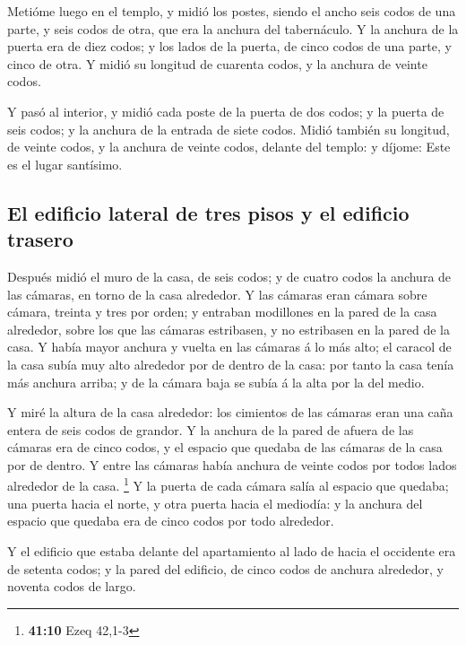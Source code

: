  Metióme luego en el templo, y midió los postes, siendo el
ancho seis codos de una parte, y seis codos de otra, que era la anchura
del tabernáculo.  Y la anchura de la puerta era de diez
codos; y los lados de la puerta, de cinco codos de una parte, y cinco de
otra. Y midió su longitud de cuarenta codos, y la anchura de veinte
codos.

 Y pasó al interior, y midió cada poste de la puerta de
dos codos; y la puerta de seis codos; y la anchura de la entrada de
siete codos.  Midió también su longitud, de veinte codos,
y la anchura de veinte codos, delante del templo: y díjome: Este es el
lugar santísimo.

\hypertarget{el-edificio-lateral-de-tres-pisos-y-el-edificio-trasero}{%
\subsection{El edificio lateral de tres pisos y el edificio
trasero}\label{el-edificio-lateral-de-tres-pisos-y-el-edificio-trasero}}

 Después midió el muro de la casa, de seis codos; y de
cuatro codos la anchura de las cámaras, en torno de la casa alrededor.
 Y las cámaras eran cámara sobre cámara, treinta y tres
por orden; y entraban modillones en la pared de la casa alrededor, sobre
los que las cámaras estribasen, y no estribasen en la pared de la casa.
 Y había mayor anchura y vuelta en las cámaras á lo más
alto; el caracol de la casa subía muy alto alrededor por de dentro de la
casa: por tanto la casa tenía más anchura arriba; y de la cámara baja se
subía á la alta por la del medio.

 Y miré la altura de la casa alrededor: los cimientos de
las cámaras eran una caña entera de seis codos de grandor.
 Y la anchura de la pared de afuera de las cámaras era de
cinco codos, y el espacio que quedaba de las cámaras de la casa por de
dentro.  Y entre las cámaras había anchura de veinte
codos por todos lados alrededor de la casa. \footnote{\textbf{41:10}
  Ezeq 42,1-3}  Y la puerta de cada cámara salía al
espacio que quedaba; una puerta hacia el norte, y otra puerta hacia el
mediodía: y la anchura del espacio que quedaba era de cinco codos por
todo alrededor.

 Y el edificio que estaba delante del apartamiento al
lado de hacia el occidente era de setenta codos; y la pared del
edificio, de cinco codos de anchura alrededor, y noventa codos de largo.

